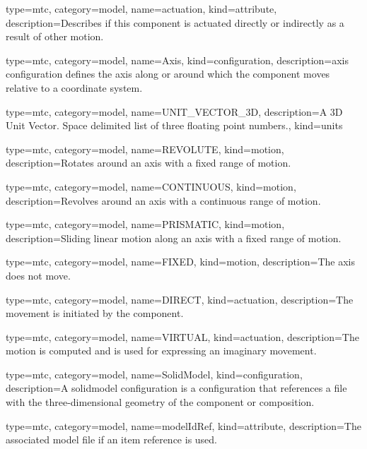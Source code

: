 {
  type=mtc,
  category=model,
  name={actuation},
  kind={attribute},
  description={Describes if this \gls{component} is actuated directly or indirectly as a result of other motion.}
}

{
  type=mtc,
  category=model,
  name={Axis},
  kind={configuration},
  description={\gls{axis configuration} defines the axis along or around which the \gls{component} moves relative to a coordinate system.}
}

{
  type=mtc,
  category=model,
  name={UNIT\_VECTOR\_3D},
  description={A 3D Unit Vector. \newline Space delimited list of three floating point numbers.},
  kind={units}
}

{
  type=mtc,
  category=model,
  name={REVOLUTE},
  kind={motion},
  description={Rotates around an axis with a fixed range of motion.}
}

{
  type=mtc,
  category=model,
  name={CONTINUOUS},
  kind={motion},
  description={Revolves around an axis with a continuous range of motion.}
}

{
  type=mtc,
  category=model,
  name={PRISMATIC},
  kind={motion},
  description={Sliding linear motion along an axis with a fixed range of motion.}
}

{
  type=mtc,
  category=model,
  name={FIXED},
  kind={motion},
  description={The axis does not move.}
}

{
  type=mtc,
  category=model,
  name={DIRECT},
  kind={actuation},
  description={The movement is initiated by the \gls{component}.}
}

{
  type=mtc,
  category=model,
  name={VIRTUAL},
  kind={actuation},
  description={The motion is computed and is used for expressing an imaginary movement.}
}

{
  type=mtc,
  category=model,
  name={SolidModel},
  kind={configuration},
  description={A \gls{solidmodel configuration} is a \gls{configuration} that references a file with the three-dimensional geometry of the \gls{component} or \gls{composition}.}
}

{
  type=mtc,
  category=model,
  name={modelIdRef},
  kind={attribute},
  description={The associated model file if an item reference is used.}
}

